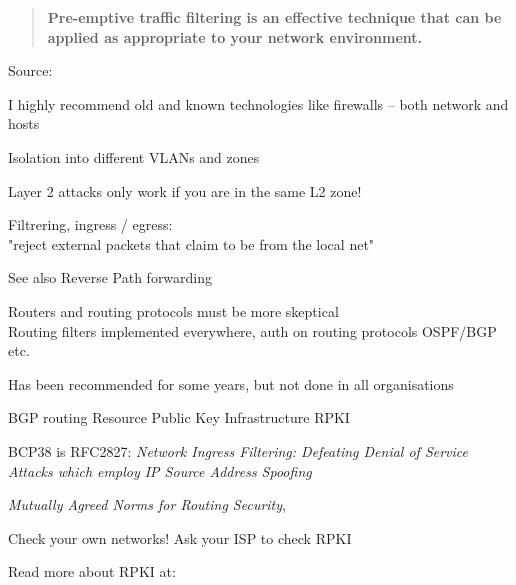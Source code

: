 \documentclass[Screen16to9,17pt]{foils}
\begin{document}
\begin{quote}
{\bf Pre-emptive traffic filtering is an effective technique that can be applied as appropriate to your network environment.}
\end{quote}
Source: 

\begin{list2}
\item I highly recommend old and known technologies like firewalls -- both network and hosts
\item Isolation into different VLANs and zones
\item Layer 2 attacks only work if you are in the same L2 zone!
\end{list2}


\begin{list2}
\item Filtrering, ingress / egress:\\
"reject external packets that claim to be from the local net"
\item See also Reverse Path forwarding 
\item Routers and routing protocols must be more skeptical\\
Routing filters implemented everywhere, auth on routing protocols OSPF/BGP etc.
\item Has been recommended for some years, but not done in all organisations
\item BGP routing Resource Public Key Infrastructure RPKI
\item BCP38 is RFC2827: \emph{Network Ingress Filtering: Defeating Denial of Service Attacks which employ IP Source Address Spoofing}\\
\item \emph{Mutually Agreed Norms for Routing Security}, 
\end{list2}




\begin{list2}
\item Check your own networks! Ask your ISP to check RPKI\\
\item Read more about RPKI at:\\
\end{list2}
\end{document}
